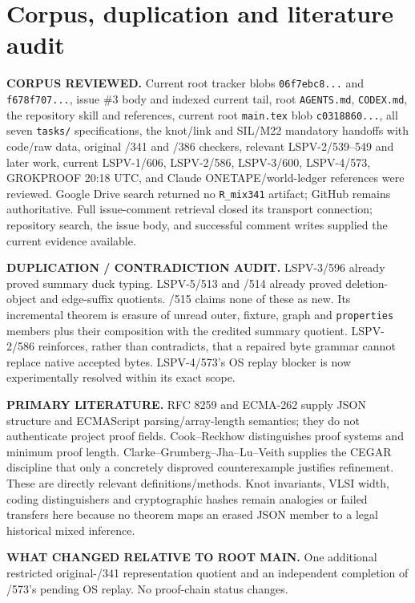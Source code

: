 \documentclass[11pt]{article}
\begin{document}
\section*{Corpus, duplication and literature audit}
\textbf{CORPUS REVIEWED.}  Current root tracker blobs \texttt{06f7ebc8...} and \texttt{f678f707...}, issue \#3 body and indexed current tail, root \texttt{AGENTS.md}, \texttt{CODEX.md}, the repository skill and references, current root \texttt{main.tex} blob \texttt{c0318860...}, all seven \texttt{tasks/} specifications, the knot/link and SIL/M22 mandatory handoffs with code/raw data, original /341 and /386 checkers, relevant LSPV-2/539--549 and later work, current LSPV-1/606, LSPV-2/586, LSPV-3/600, LSPV-4/573, GROKPROOF 20:18 UTC, and Claude ONETAPE/world-ledger references were reviewed.  Google Drive search returned no \texttt{R\_mix341} artifact; GitHub remains authoritative.  Full issue-comment retrieval closed its transport connection; repository search, the issue body, and successful comment writes supplied the current evidence available.

\textbf{DUPLICATION / CONTRADICTION AUDIT.}  LSPV-3/596 already proved summary duck typing.  LSPV-5/513 and /514 already proved deletion-object and edge-suffix quotients.  /515 claims none of these as new.  Its incremental theorem is erasure of unread outer, fixture, graph and \texttt{properties} members plus their composition with the credited summary quotient.  LSPV-2/586 reinforces, rather than contradicts, that a repaired byte grammar cannot replace native accepted bytes.  LSPV-4/573's OS replay blocker is now experimentally resolved within its exact scope.

\textbf{PRIMARY LITERATURE.}  RFC 8259 and ECMA-262 supply JSON structure and ECMAScript parsing/array-length semantics; they do not authenticate project proof fields.  Cook--Reckhow distinguishes proof systems and minimum proof length.  Clarke--Grumberg--Jha--Lu--Veith supplies the CEGAR discipline that only a concretely disproved counterexample justifies refinement.  These are directly relevant definitions/methods.  Knot invariants, VLSI width, coding distinguishers and cryptographic hashes remain analogies or failed transfers here because no theorem maps an erased JSON member to a legal historical mixed inference.

\textbf{WHAT CHANGED RELATIVE TO ROOT MAIN.}  One additional restricted original-/341 representation quotient and an independent completion of /573's pending OS replay.  No proof-chain status changes.
\end{document}
